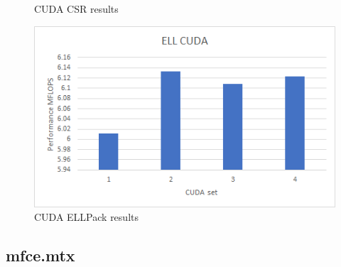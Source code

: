 \documentclass{scrreprt}
\begin{document}
\begin{figure}[ht]
\begin{minipage}[b]{0.5\linewidth}
    \caption{CUDA CSR results} 
    \vspace{4ex}
  \end{minipage}%
  \begin{minipage}[b]{0.5\linewidth}
    \centering
    \includegraphics[width=.9\linewidth]{mhda416ELLCUDA.png} 
    \caption{CUDA ELLPack  results} 
    \vspace{4ex}
  \end{minipage} 
\end{figure}
\FloatBarrier



\subsection{mfce.mtx}
\end{document}
